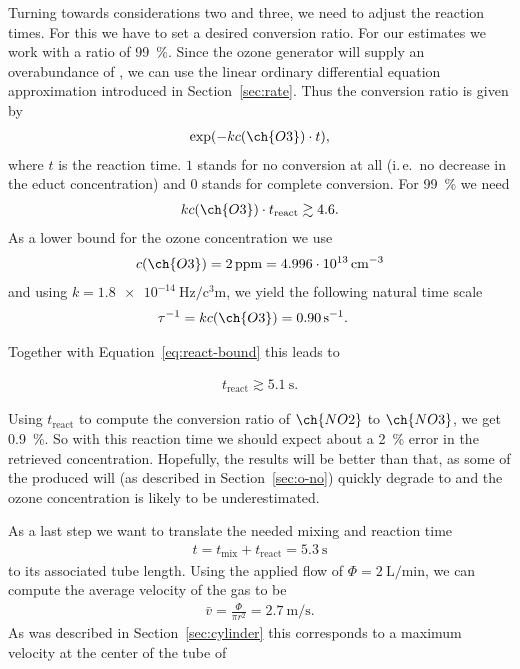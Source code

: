 Turning towards considerations two and three, we need to adjust the
reaction times. For this we have to set a desired conversion
ratio. For our estimates we work with a ratio of \SI{99}{\%}. 
Since the ozone generator will supply an
overabundance of , we can use the linear ordinary
differential equation approximation introduced in
Section~\ref{sec:rate}. Thus the conversion ratio is
given by
\begin{align*}
  \exp(-kc(\ch{O3})\cdot t),
\end{align*}
where $t$ is the reaction time. $1$ stands for no
conversion at all (i.\,e.\ no decrease in the educt concentration) and
$0$ stands for complete conversion. For \SI{99}{\%} we need
\begin{align}
  kc(\ch{O3}) \cdot t_{\text{react}} \gtrsim 4.6. \label{eq:react-bound}
\end{align}
As a lower bound for the ozone concentration we use
\begin{align*}
  c(\ch{O3}) = \SI{2}{ppm} = \SI{4.996e13}{\per\cubic\centi\meter} 
\end{align*}
and using $k = \SI{1.8e-14}{\hertz\per\cubic\centi\meter}$, we yield
the following natural time scale
\begin{align*}
  \tau^{-1} & = k c(\ch{O3}) = \SI{0.90}{\per\second}.
\end{align*}

Together with Equation~\eqref{eq:react-bound} this leads to

\begin{align*}
  t_{\text{react}} \gtrsim \SI{5.1}{\second}.
\end{align*}

Using $t_{\text{react}}$ to compute the conversion ratio of
$\ch{NO2}$ to $\ch{NO3}$, we get \SI{0.9}{\%}. So with this reaction
time we should expect about a \SI{2}{\%} error in the retrieved
 concentration. Hopefully, the results will be better than
that, as some of the produced  will (as described in
Section~\ref{sec:o-no}) quickly degrade to  and the ozone
concentration is likely to be underestimated.

As a last step we want to translate the needed mixing and reaction
time
\begin{align*}
  t = t_{\text{mix}} + t_{\text{react}} = \SI{5.3}{\second}
\end{align*}
to its associated tube length. Using the applied flow
of $\Phi = \SI{2}{\liter\per\minute}$, we can compute the average
velocity of the gas to be
\begin{align*}
  \bar v = \frac{\Phi}{\pi r^2} = \SI{2.7}{\meter\per\second}. 
\end{align*}
As was described in Section~\ref{sec:cylinder} this corresponds to a
maximum velocity at the center of the tube of

